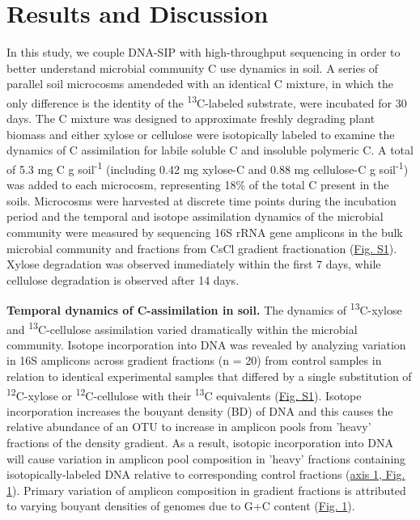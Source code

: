 \section{Results and Discussion}

In this study, we couple DNA-SIP with high-throughput sequencing in order to better understand microbial community C use dynamics in soil. A series of parallel soil microcosms amendeded with an identical C mixture, in which the only difference is the identity of the \textsuperscript{13}C-labeled substrate, were incubated for 30 days. The C mixture was designed to approximate freshly degrading plant biomass and either xylose or cellulose were isotopically labeled to examine the dynamics of C assimilation for labile soluble C and insoluble polymeric C. A total of 5.3 mg C g soil\textsuperscript{-1} (including 0.42 mg xylose-C and 0.88 mg cellulose-C g soil\textsuperscript{-1}) was added to each microcosm, representing 18\% of the total C present in the soils. Microcosms were harvested at discrete time points during the incubation period and the temporal and isotope assimilation dynamics of the microbial community were measured by sequencing 16S rRNA gene amplicons in the bulk microbial community and fractions from CsCl gradient fractionation (\href{https://www.authorea.com/users/3537/articles/8459/master/file/figures/20140708_ConceptualFig2/20140708_ConceptualFig2.pdf}{Fig. S1}). Xylose degradation was observed immediately within the first 7 days, while cellulose degradation is observed after 14 days.

\textbf{Temporal dynamics of C-assimilation in soil.}  
The dynamics of \textsuperscript{13}C-xylose and \textsuperscript{13}C-cellulose assimilation varied dramatically within the microbial community. Isotope incorporation into DNA was revealed by analyzing variation in 16S amplicons across gradient fractions (n = 20) from control samples in relation to identical experimental samples that differed by a single substitution of \textsuperscript{12}C-xylose or \textsuperscript{12}C-cellulose with their \textsuperscript{13}C equivalents (\href{https://www.authorea.com/users/3537/articles/8459/master/file/figures/20140708_ConceptualFig2/20140708_ConceptualFig2.pdf}{Fig. S1}). Isotope incorporation increases the bouyant density (BD) of DNA and this causes the relative abundance of an OTU to increase in amplicon pools from 'heavy' fractions of the density gradient. As a result, isotopic incorporation into DNA will cause variation in amplicon pool composition in 'heavy' fractions containing isotopically-labeled DNA relative to corresponding control fractions (\href{https://www.authorea.com/users/3537/articles/3612/master/file/figures/ordination_all1/ordination_all1.png}{axis 1, Fig. 1}). Primary variation of amplicon composition in gradient fractions is attributed to varying bouyant densities of genomes due to G+C content (\href{https://www.authorea.com/users/3537/articles/3612/master/file/figures/ordination_all1/ordination_all1.png}{Fig. 1}). 

